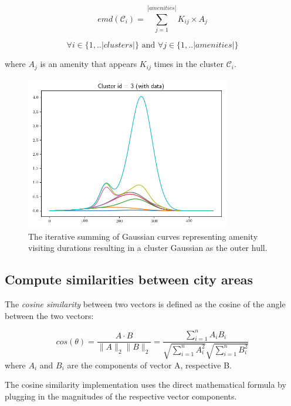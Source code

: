 \documentclass{ws-ijait}
\begin{document}
		\begin{equation}
		emd(\mathcal{C}_i) = \sum_{j=1}^{|amenities|} K_{ij} \times A_j
		\end{equation}
		
		$$\forall i \in \{1,..|clusters|\} \text{ and } \forall j \in \{1,..|amenities|\}$$
		
		where $A_j$ is an amenity that appears $K_{ij}$ times in the cluster $\mathcal{C}_i$.
		
		\begin{figure}[!ht]
			\centering
			\includegraphics[width=0.8\textwidth]{../graphics/emd_gaussian_addition3.png}
			\caption{The iterative summing of Gaussian curves representing amenity visiting durations resulting in a cluster Gaussian as the outer hull.}
			\label{fig:gaussian}
		\end{figure}
		
		\subsection{Compute similarities between city areas}
		The \textit{cosine similarity} between two vectors is defined as the cosine of the angle between the two vectors:
		
		\begin{equation}
		cos(\theta)=\frac{A\cdot B}{{\lVert}A{\rVert}       
			_2{\lVert}B{\rVert}_2}=\frac{\sum_{i=1}^n{A_iB_i}}{\sqrt{\sum_{i=1}^n{A_i^2}}\sqrt{\sum_{i=1}^n{B_i^2}}}
		\end{equation}
		where $A_i$ and $B_i$ are the components of vector A, respective B. 
		
		The cosine similarity implementation uses the direct mathematical formula by plugging in the magnitudes of the respective vector components.
		
\end{document}
